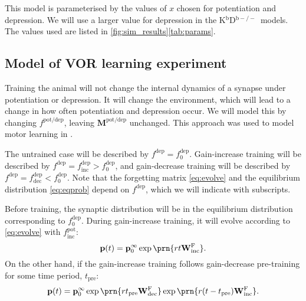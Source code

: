\documentclass[10pt]{article}
\newcommand{\pr}{\mathbf{p}}
\newcommand{\eq}{\pr^\infty}
\newcommand{\W}{\mathbf{W}}
\newcommand{\frg}{\W^\mathrm{F}}
\newcommand{\M}{\mathbf{M}}
\newcommand{\pot}{^{\text{pot}}}
\newcommand{\dep}{^{\text{dep}}}
\newcommand{\potdep}{^{\text{pot/dep}}}
\newcommand{\norm}{_0}
\newcommand{\inc}{_{\text{inc}}}
\newcommand{\dec}{_{\text{dec}}}
\newcommand{\KO}{K$^\mathrm{b}$D$^{\mathrm{b}-/-}$}
\newcommand{\tpre}{t_{\text{pre}}}
\begin{document}
This model is parameterised by the values of $x$ chosen for potentiation and depression.
We will use a larger value for depression in the \KO\ models.
The values used are listed in \autoref{fig:sim_results}\ref{tab:params}.








\subsection{Model of VOR learning experiment}\label{sec:learning}

Training the animal will not change the internal dynamics of a synapse under potentiation or depression.
It will change the environment, which will lead to a change in how often potentiation and depression occur.
We will model this by changing $f\potdep$, leaving $\M\potdep$ unchanged.
This approach was used to model motor learning in \cite{Smith2006savings}.

The untrained case will be described by $f\dep=f\dep\norm$.
Gain-increase training  will be described by $f\dep=f\dep\inc>f\dep\norm$, and
gain-decrease training  will be described by $f\dep=f\dep\dec<f\dep\norm$.
Note that the forgetting matrix \eqref{eq:evolve} and the equilibrium distribution \eqref{eq:eqprob} depend on $f\dep$, which we will indicate with subscripts.

Before training, the synaptic distribution will be in the equilibrium distribution corresponding to $f\dep\norm$.
During gain-increase training, it will evolve according to \eqref{eq:evolve} with $f\pot\inc$:
%
\begin{equation}\label{eq:nopre}
  \pr(t) = \eq\norm \exp\prn{rt\frg\inc}.
\end{equation}
%
On the other hand, if the gain-increase training follows gain-decrease pre-training for some time period, $\tpre$:
%
\begin{equation}\label{eq:withpre}
  \pr(t) = \eq\norm \exp\prn{r\tpre\frg\dec} \exp\prn{r(t-\tpre)\frg\inc}.
\end{equation}
%
\end{document}

